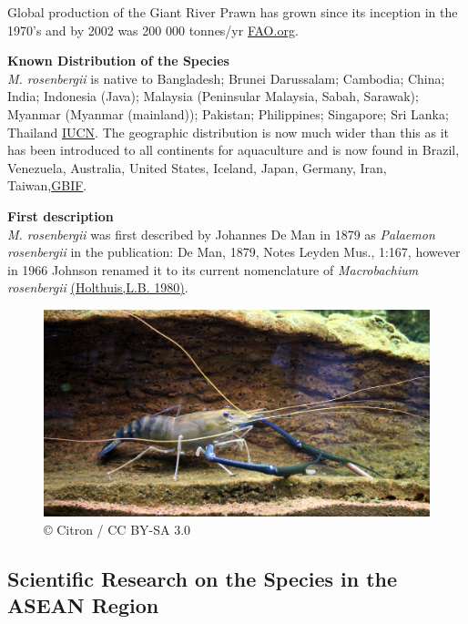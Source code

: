 \documentclass[]{book}
\theoremstyle{definition}
\theoremstyle{definition}
\theoremstyle{definition}
\theoremstyle{remark}
\begin{document}
Global production of the Giant River Prawn has grown since its inception
in the 1970's and by 2002 was 200 000 tonnes/yr
\href{http://www.fao.org/fishery/culturedspecies/Macrobrachium_rosenbergii/en}{FAO.org}.

\textbf{Known Distribution of the Species}\\
\emph{M. rosenbergii} is native to Bangladesh; Brunei Darussalam;
Cambodia; China; India; Indonesia (Java); Malaysia (Peninsular Malaysia,
Sabah, Sarawak); Myanmar (Myanmar (mainland)); Pakistan; Philippines;
Singapore; Sri Lanka; Thailand
\href{http://www.iucnredlist.org/details/197873/0}{IUCN}. The geographic
distribution is now much wider than this as it has been introduced to
all continents for aquaculture and is now found in Brazil, Venezuela,
Australia, United States, Iceland, Japan, Germany, Iran,
Taiwan,\href{https://www.gbif.org/species/2224546}{GBIF}.

\textbf{First description}\\
\emph{M. rosenbergii} was first described by Johannes De Man in 1879 as
\emph{Palaemon rosenbergii} in the publication: De Man, 1879, Notes
Leyden Mus., 1:167, however in 1966 Johnson renamed it to its current
nomenclature of \emph{Macrobachium rosenbergii}
\href{http://www.fao.org/fi/oldsite/eims_search/advanced_s_result.asp?JOB_NO=AC477}{(Holthuis,L.B.
1980)}.

\begin{figure}
\centering
\includegraphics{images_species/Macrobrachium_rosenbergii.jpg}
\caption{© Citron / CC BY-SA 3.0}
\end{figure}

\hypertarget{scientific-research-on-the-species-in-the-asean-region-2}{%
\subsection{Scientific Research on the Species in the ASEAN
Region}\label{scientific-research-on-the-species-in-the-asean-region-2}}
\end{document}
